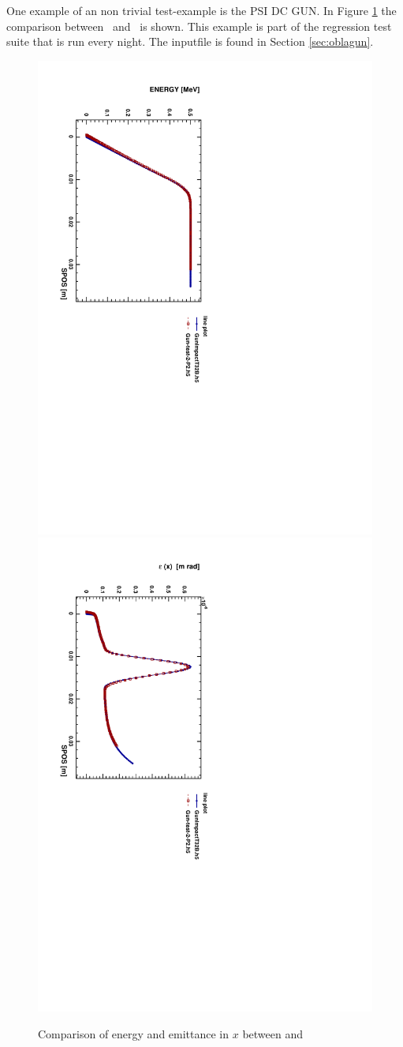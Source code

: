 One example of an non trivial test-example is the PSI DC GUN. In Figure \ref{fig:guncomp1} the comparison between \impactt\ and \opalt\ is shown. This example is part of the regression test suite
that is run every night. The inputfile is found in Section \ref{sec:oblagun}.  
\begin{figure}[ht]
 \begin{center} 
   \includegraphics[width=0.60\linewidth,angle=90]{figures/Gun/GunCompEn}
   \includegraphics[width=0.60\linewidth,angle=90]{figures/Gun/GunCompEx}
   \caption{Comparison of energy and emittance in $x$ between \impactt and \opalt}   
   \label{fig:guncomp1}
 \end{center}
\end{figure}

